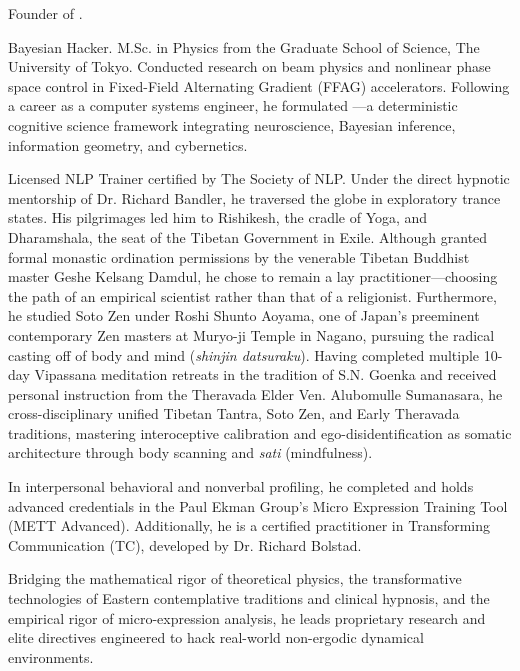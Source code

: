     Founder of \fullSNLP.

    Bayesian Hacker. M.Sc. in Physics from the Graduate School of Science, The University of Tokyo. Conducted research on beam physics and nonlinear phase space control in Fixed-Field Alternating Gradient (FFAG) accelerators. Following a career as a computer systems engineer, he formulated \fullSNLP---a deterministic cognitive science framework integrating neuroscience, Bayesian inference, information geometry, and cybernetics.

    Licensed NLP Trainer certified by The Society of NLP\texttrademark. Under the direct hypnotic mentorship of Dr. Richard Bandler, he traversed the globe in exploratory trance states. His pilgrimages led him to Rishikesh, the cradle of Yoga, and Dharamshala, the seat of the Tibetan Government in Exile. Although granted formal monastic ordination permissions by the venerable Tibetan Buddhist master Geshe Kelsang Damdul, he chose to remain a lay practitioner---choosing the path of an empirical scientist rather than that of a religionist. Furthermore, he studied Soto Zen under Roshi Shunto Aoyama, one of Japan's preeminent contemporary Zen masters at Muryo-ji Temple in Nagano, pursuing the radical casting off of body and mind (\textit{shinjin datsuraku}). Having completed multiple 10-day Vipassana meditation retreats in the tradition of S.N. Goenka and received personal instruction from the Theravada Elder Ven. Alubomulle Sumanasara, he cross-disciplinary unified Tibetan Tantra, Soto Zen, and Early Theravada traditions, mastering interoceptive calibration and ego-disidentification as somatic architecture through body scanning and \textit{sati} (mindfulness).

    In interpersonal behavioral and nonverbal profiling, he completed and holds advanced credentials in the Paul Ekman Group's Micro Expression Training Tool (METT Advanced). Additionally, he is a certified practitioner in Transforming Communication (TC), developed by Dr. Richard Bolstad.

    Bridging the mathematical rigor of theoretical physics, the transformative technologies of Eastern contemplative traditions and clinical hypnosis, and the empirical rigor of micro-expression analysis, he leads proprietary research and elite directives engineered to hack real-world non-ergodic dynamical environments.
\fi
